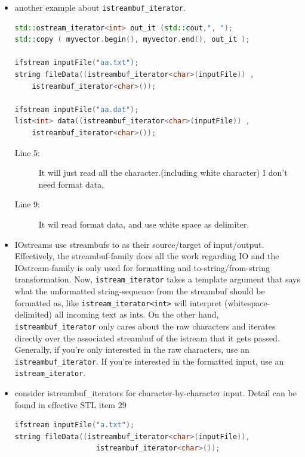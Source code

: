 \documentclass[a4paper,11pt,twoside]{book}
\begin{document}
\begin{itemize}
\begin{lstlisting}[frame=single, language=c++]
vector<Date>::iterator first = 
	find( e.begin(), e.end(), "01/01/95" );

vector<Date>::iterator last = 
	find( e.begin(), e.end(), "12/31/95" );
*last = "12/30/95";
copy( first, last, ostream_iterator<Date>( cout, "\n" ) );
e.insert( --e.end(), TodaysDate() );
\end{lstlisting}


\item another example about \texttt{istreambuf\_iterator}.
\begin{lstlisting}[frame=single, language=c++]
std::ostream_iterator<int> out_it (std::cout,", ");
std::copy ( myvector.begin(), myvector.end(), out_it );

ifstream inputFile("aa.txt");
string fileData((istreambuf_iterator<char>(inputFile)) ,
	istreambuf_iterator<char>());

ifstream inputFile("aa.dat");
list<int> data((istreambuf_iterator<char>(inputFile)) ,
	istreambuf_iterator<char>());
\end{lstlisting}
\begin{description}
	\item[Line 5:] It will just read all the character.(including white character) I don't need format data,
	\item[Line 9:] It wil  read format data, and use white space as delimiter.
\end{description}

\item IOstreams use streambufs to as their source/target of input/output. Effectively, the streambuf-family does all the work regarding IO and the IOstream-family is only used for formatting and to-string/from-string transformation. Now, \texttt{istream\_iterator} takes a template argument that says what the unformatted string-sequence from the streambuf should be formatted as, like \texttt{istream\_iterator<int>} will interpret (whitespace-delimited) all incoming text as ints. On the other hand, \texttt{istreambuf\_iterator} only cares about the raw characters and iterates directly over the associated streambuf of the istream that it gets passed. Generally, if you're only interested in the raw characters, use an \texttt{istreambuf\_iterator}. If you're interested in the formatted input, use an \texttt{istream\_iterator}.

\item consider istreambuf\_iterators for character-by-character input. Detail can be found in effective STL item 29
\begin{lstlisting}[frame=single, language=c++]
ifstream inputFile("a.txt");
string fileData((istreambuf_iterator<char>(inputFile)),
                   istreambuf_iterator<char>());
\end{lstlisting}

\end{itemize}
\end{document}

